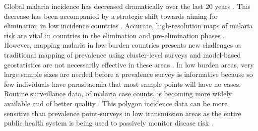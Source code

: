 \documentclass[10pt,letterpaper]{article}
\begin{document}

Global malaria incidence has decreased dramatically over the last 20 years \cite{abajobir2017global, bhatt2015effect}.
This decrease has been accompanied by a strategic shift towards aiming for elimination in low incidence countries \cite{world2016world, newby2016path}.
Accurate, high-resolution maps of malaria risk are vital in countries in the elimination and pre-elimination phases \cite{sturrock2016mapping, cohen2017mapping}.
However, mapping malaria in low burden countries presents new challenges as traditional mapping of prevalence \cite{gething2011new, bhatt2017improved, gething2012long, bhatt2015effect} using cluster-level surveys and model-based geostatistics are not necessarily effective in these areas \cite{sturrock2016mapping, sturrock2014fine}.
In low burden areas, very large sample sizes are needed before a prevalence survey is informative because so few individuals have parasitaemia that most sample points will have no cases.
Routine surveillance data, of malaria case counts, is becoming more widely available and of better quality \cite{sturrock2016mapping, ohrt2015information, cibulskis2011worldwide}.
This polygon incidence data can be more sensitive than prevalence point-surveys in low transmission areas as the entire public health system is being used to passively monitor disease risk \cite{cibulskis2011worldwide}.



\end{document}
